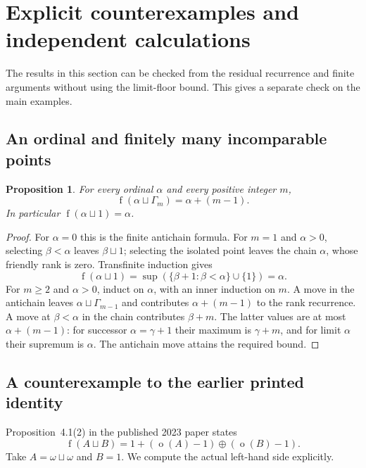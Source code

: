 \documentclass[11pt,a4paper]{article}
\newtheorem{proposition}[proposition]{Proposition}
\theoremstyle{definition}
\theoremstyle{remark}
\DeclareMathOperator{\mot}{o}
\DeclareMathOperator{\fot}{f}
\newcommand{\ds}{\mathbin{\sqcup}}
\begin{document}
\section{Explicit counterexamples and independent calculations}\label{sec:counterexamples}

The results in this section can be checked from the residual recurrence
and finite arguments without using the limit-floor bound. This gives a
separate check on the main examples.

\subsection{An ordinal and finitely many incomparable points}

\begin{proposition}\label{prop:ordinal-antichain}
For every ordinal $\alpha$ and every positive integer $m$,
\begin{equation}\label{eq:ordinal-antichain}
\fot(\alpha\ds\Gamma_m)=\alpha+(m-1).
\end{equation}
In particular $\fot(\alpha\ds1)=\alpha$.
\end{proposition}
\begin{proof}
For $\alpha=0$ this is the finite antichain formula. For $m=1$ and
$\alpha>0$, selecting $\beta<\alpha$ leaves $\beta\ds1$; selecting the
isolated point leaves the chain $\alpha$, whose friendly rank is zero.
Transfinite induction gives
\[
\fot(\alpha\ds1)=\sup\left(\{\beta+1:\beta<\alpha\}\cup\{1\}\right)
=\alpha.
\]
For $m\geq2$ and $\alpha>0$, induct on $\alpha$, with an inner induction on
$m$. A move in the antichain leaves $\alpha\ds\Gamma_{m-1}$ and contributes
$\alpha+(m-1)$ to the rank recurrence. A move at $\beta<\alpha$ in the
chain contributes $\beta+m$. The latter values are at most
$\alpha+(m-1)$: for successor $\alpha=\gamma+1$ their maximum is
$\gamma+m$, and for limit $\alpha$ their supremum is $\alpha$. The antichain
move attains the required bound.
\end{proof}

\subsection{A counterexample to the earlier printed identity}\label{sec:printed}

Proposition~4.1(2) in the published 2023 paper states
\begin{equation}\label{eq:printed}
\fot(A\ds B)=1+(\mot(A)-1)\oplus(\mot(B)-1).
\end{equation}
Take $A=\omega\ds\omega$ and $B=1$. We compute the actual left-hand side
explicitly.
\end{document}
